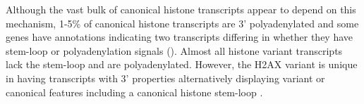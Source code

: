 	Although the vast bulk of canonical histone transcripts appear to depend on this mechanism, 
	1-5\% of canonical histone transcripts are 3' polyadenylated  
	and some genes have annotations indicating two transcripts 
	differing in whether they have stem-loop or polyadenylation signals (). 
	Almost all histone variant transcripts lack the stem-loop and are polyadenylated. 
	However, the H2AX variant is unique in having transcripts with 3' properties alternatively displaying
	variant or canonical features including a canonical histone stem-loop \citep{HTwoAX-transcripts}. 

  \begin{figure*}
    \centering
    \hfill
  \end{figure*}

